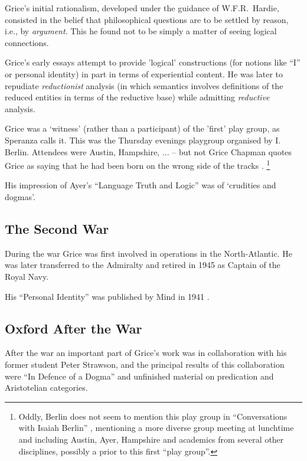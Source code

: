 \documentclass[10pt,titlepage]{book}
\begin{document}
Grice's initial rationalism, developed under the guidance of W.F.R.~Hardie, consisted in the belief that philosophical questions are to be settled by reason, i.e., by \emph{argument}.
This he found not to be simply a matter of seeing logical connections.

Grice's early essays attempt to provide 'logical' constructions (for notions like ``I'' or  personal identity) in part in terms of experiential content.
He was later to repudiate \emph{reductionist} analysis (in which semantics involves definitions of the reduced entities in terms of the reductive base) while admitting \emph{reductive} analysis. 

Grice was a `witness' (rather than a participant) of the 'first' play group, as Speranza calls it.
This  was the Thursday evenings playgroup organised by I. Berlin.
Attendees were Austin, Hampshire, ... -- but not Grice
Chapman quotes Grice as saying that he had been born on the wrong side of the tracks \cite{chapman2006}.
\footnote{Oddly, Berlin does not seem to mention this play group in ``Conversations with Isaiah Berlin'' \cite{berlin91}, mentioning a more diverse group meeting at lunchtime and including Austin, Ayer, Hampshire and academics from several other disciplines, possibly a prior to this first ``play group''.}

His impression of Ayer's ``Language Truth and Logic'' \cite{ayer1936} was of `crudities and dogmas'.

\subsection{The Second War}

During the war Grice was first involved in operations in the North-Atlantic.
He was later transferred to the Admiralty and retired in 1945 as Captain of the Royal  
Navy.

His ``Personal Identity'' was published by Mind in 1941 \cite{grice41}. 

\subsection{Oxford After the War}

After the war an important part of Grice's work was in collaboration with his former student Peter Strawson, and the principal results of this collaboration were ``In Defence of a Dogma'' \cite{grice56} and unfinished material on predication and Aristotelian categories.
\end{document}
